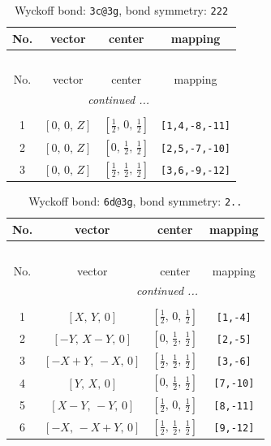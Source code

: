 \documentclass[fleqn,8pt]{jsarticle}
\begin{document}
\renewcommand{\arraystretch}{1.2}
\begin{longtable}{cccc}
\caption{Wyckoff bond: {\tt 3c@3g}, bond symmetry: {\tt 222}}
 \\
 \hline \hline
No. & vector & center & mapping \\ \hline \endfirsthead

\multicolumn{3}{l}{\tablename\ \thetable{}} \\
 \hline \hline
No. & vector & center & mapping \\ \hline \endhead

 \hline \hline
\multicolumn{3}{r}{\footnotesize\it continued ...} \\ \endfoot

 \hline \hline
\multicolumn{3}{r}{} \\ \endlastfoot

1 & $\left[ 0,\, 0,\, Z \right]$ & $\left[ \frac{1}{2},\, 0,\, \frac{1}{2} \right]$ & {\tt [1,4,-8,-11]} \\ \hline
2 & $\left[ 0,\, 0,\, Z \right]$ & $\left[ 0,\, \frac{1}{2},\, \frac{1}{2} \right]$ & {\tt [2,5,-7,-10]} \\ \hline
3 & $\left[ 0,\, 0,\, Z \right]$ & $\left[ \frac{1}{2},\, \frac{1}{2},\, \frac{1}{2} \right]$ & {\tt [3,6,-9,-12]} \\
\end{longtable}
\renewcommand{\arraystretch}{1.2}
\begin{longtable}{cccc}
\caption{Wyckoff bond: {\tt 6d@3g}, bond symmetry: {\tt 2..}}
 \\
 \hline \hline
No. & vector & center & mapping \\ \hline \endfirsthead

\multicolumn{3}{l}{\tablename\ \thetable{}} \\
 \hline \hline
No. & vector & center & mapping \\ \hline \endhead

 \hline \hline
\multicolumn{3}{r}{\footnotesize\it continued ...} \\ \endfoot

 \hline \hline
\multicolumn{3}{r}{} \\ \endlastfoot

1 & $\left[ X,\, Y,\, 0 \right]$ & $\left[ \frac{1}{2},\, 0,\, \frac{1}{2} \right]$ & {\tt [1,-4]} \\ \hline
2 & $\left[ - Y,\, X - Y,\, 0 \right]$ & $\left[ 0,\, \frac{1}{2},\, \frac{1}{2} \right]$ & {\tt [2,-5]} \\ \hline
3 & $\left[ - X + Y,\, - X,\, 0 \right]$ & $\left[ \frac{1}{2},\, \frac{1}{2},\, \frac{1}{2} \right]$ & {\tt [3,-6]} \\ \hline
4 & $\left[ Y,\, X,\, 0 \right]$ & $\left[ 0,\, \frac{1}{2},\, \frac{1}{2} \right]$ & {\tt [7,-10]} \\ \hline
5 & $\left[ X - Y,\, - Y,\, 0 \right]$ & $\left[ \frac{1}{2},\, 0,\, \frac{1}{2} \right]$ & {\tt [8,-11]} \\ \hline
6 & $\left[ - X,\, - X + Y,\, 0 \right]$ & $\left[ \frac{1}{2},\, \frac{1}{2},\, \frac{1}{2} \right]$ & {\tt [9,-12]} \\
\end{longtable}
\end{document}
